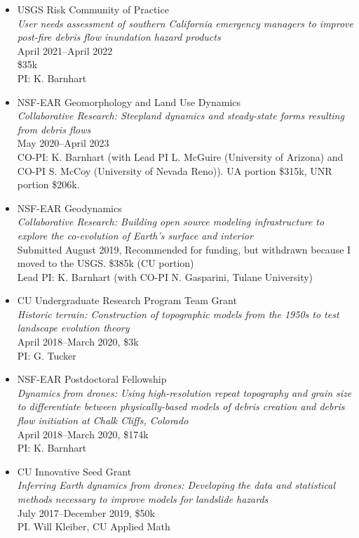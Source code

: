 \documentclass[10pt]{article}
\begin{document}
\begin{itemize}
	\item 
	USGS Risk Community of Practice\\ 
	\textit{User needs assessment of southern California emergency managers to improve post-fire debris flow inundation hazard products}\\
	April 2021--April 2022\\
	\$35k \\
	PI: K. Barnhart
	
	\item 
	NSF-EAR Geomorphology and Land Use Dynamics\\ 
	\textit{Collaborative Research: Steepland dynamics and steady-state forms resulting from debris flows}\\
	May 2020--April 2023\\
	CO-PI: K. Barnhart (with Lead PI L. McGuire (University of Arizona) and CO-PI S. McCoy (University of Nevada Reno)). UA portion \$315k, UNR portion \$206k.
	
	\item NSF-EAR Geodynamics\\ 
	\textit{Collaborative Research: Building open source modeling infrastructure to explore the co-evolution of Earth's surface and interior}\\
	Submitted August 2019, Recommended for funding, but withdrawn because I moved to the USGS. \$385k (CU portion)\\
	Lead PI: K. Barnhart (with CO-PI N. Gasparini, Tulane University)
	
	\item CU Undergraduate Research Program Team Grant\\
	\textit{Historic terrain: Construction of topographic models from the 1950s to test landscape evolution theory}\\
	April 2018--March 2020, \$3k\\
	PI: G. Tucker
	
	\item NSF-EAR Postdoctoral Fellowship\\ 
	\textit{Dynamics from drones: Using high-resolution repeat topography and grain size to differentiate between physically-based models of debris creation and debris flow initiation at Chalk Cliffs, Colorado}\\
	April 2018--March 2020, \$174k\\
	PI: K. Barnhart
	
	\item CU Innovative Seed Grant\\ 
	\textit{Inferring Earth dynamics from drones:  Developing the data and statistical methods necessary to improve models for landslide hazards}\\
	July 2017--December 2019, \$50k\\
	PI. Will Kleiber, CU Applied Math
	

\end{itemize}
\end{document}
